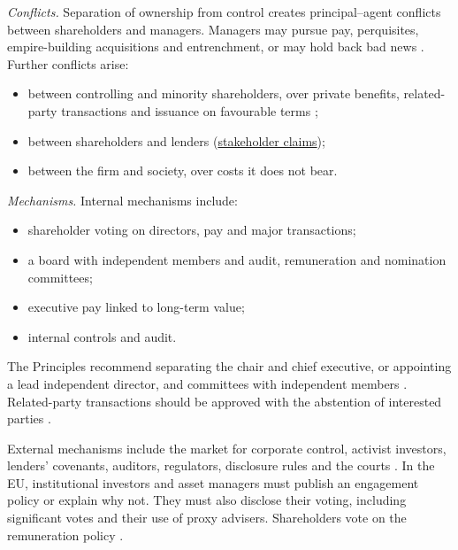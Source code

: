 \begin{qfmethod}\label{meth:corporate-governance-evaluation}
 \emph{Conflicts.} Separation of ownership from control creates principal--agent conflicts between shareholders and managers. Managers may pursue pay, perquisites, empire-building acquisitions and entrenchment, or may hold back bad news \citep[pp.~14--19, 27--29]{applied-corporate-finance-2014}. Further conflicts arise:
\begin{itemize}
\item between controlling and minority shareholders, over private benefits, related-party transactions and issuance on favourable terms \citep[principle~II.G, pp.~20--21]{oecd-g20-principles-2023};
\item between shareholders and lenders (\hyperref[def:stakeholder-claims]{stakeholder claims});
\item between the firm and society, over costs it does not bear.
\end{itemize}

\emph{Mechanisms.} Internal mechanisms include:
\begin{itemize}
\item shareholder voting on directors, pay and major transactions;
\item a board with independent members and audit, remuneration and nomination committees;
\item executive pay linked to long-term value;
\item internal controls and audit.
\end{itemize}
The Principles recommend separating the chair and chief executive, or appointing a lead independent director, and committees with independent members \citep[principles~V.E and~V.E.2, pp.~39--41]{oecd-g20-principles-2023}. Related-party transactions should be approved with the abstention of interested parties \citep[principle~II.F, pp.~19--20]{oecd-g20-principles-2023}.

External mechanisms include the market for corporate control, activist investors, lenders' covenants, auditors, regulators, disclosure rules and the courts \citep[pp.~38--42]{applied-corporate-finance-2014}. In the EU, institutional investors and asset managers must publish an engagement policy or explain why not. They must also disclose their voting, including significant votes and their use of proxy advisers. Shareholders vote on the remuneration policy \citep[Arts.~3g and~9a of Directive 2007/36/EC as inserted]{eu-2017-828-srd2}.


\end{qfmethod}
